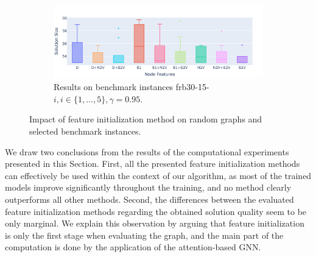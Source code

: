 \documentclass[draft,final]{vutinfth} %
\begin{document}
\begin{figure}
    \begin{subfigure}{0.9\textwidth}
        \centering
        \includegraphics[width=\textwidth]{graphics/V450-082-0825-benchmark.pdf}
        \caption{Results on benchmark instances frb30-15-$i, i \in \{1, \dots, 5\}, \gamma=0.95$.}
    \end{subfigure}
    \caption{Impact of feature initialization method on random graphs and selected benchmark instances.}
    \label{fig:node-features-comparison}
\end{figure}

We draw two conclusions from the results of the computational experiments presented in this Section. First, all the presented feature initialization methods can effectively be used within the context of our algorithm, as most of the trained models improve significantly throughout the training, and no method clearly outperforms all other methods. 
Second, the differences between the evaluated feature initialization methods regarding the obtained solution quality seem to be only marginal. We explain this observation by arguing that feature initialization is only the first stage when evaluating the graph, and the main part of the computation is done by the application of the attention-based GNN. 
\end{document}
